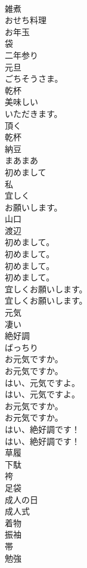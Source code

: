 \documentclass[8pt]{extreport}
\begin{document}
\begin{CJK}{UTF8}{min}
\\	雑煮
\\	おせち料理
\\	お年玉
\\	袋
\\	二年参り
\\	元旦
\\	ごちそうさま。
\\	乾杯
\\	美味しい
\\	いただきます。
\\	頂く
\\	乾杯
\\	納豆
\\	まあまあ
\\	初めまして
\\	私
\\	宜しく
\\	お願いします。
\\	山口
\\	渡辺
\\	初めまして。	
\\	初めまして。 
\\	初めまして。	
\\	初めまして。 
\\	宜しくお願いします。	
\\	宜しくお願いします。 
\\	元気
\\	凄い
\\	絶好調
\\	ばっちり
\\	お元気ですか。	
\\	お元気ですか。 
\\	はい、元気ですよ。	
\\	はい、元気ですよ。 
\\	お元気ですか。	
\\	お元気ですか。 
\\	はい、絶好調です！	
\\	はい、絶好調です！ 
\\	草履
\\	下駄
\\	袴
\\	足袋
\\	成人の日
\\	成人式
\\	着物
\\	振袖
\\	帯
\\	勉強

\end{CJK}
\end{document}
